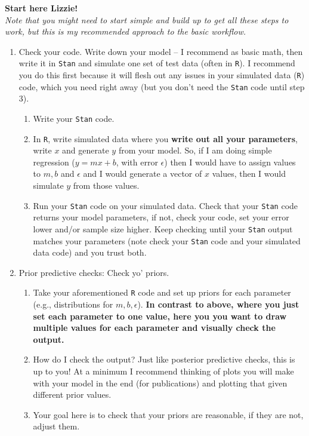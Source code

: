 \documentclass[11pt]{article}
\begin{document}
{\Large \bf Start here Lizzie!} \\

\emph{Note that you might need to start simple and build up to get all these steps to work, but this is my recommended approach to the basic workflow.}

\begin{enumerate}
\item Check your code. Write down your model -- I recommend as basic math, then write it in \verb|Stan| and simulate one set of test data (often in \verb|R|). I recommend you do this first because it will flesh out any issues in your simulated data (\verb|R|) code, which you need right away (but you don't need the \verb|Stan| code until step 3).
\begin{enumerate}
\item Write your \verb|Stan| code.
\item In \verb|R|, write simulated data where you {\bf write out all your parameters}, write $x$ and generate $y$ from your model. So, if I am doing simple regression ($y=mx+b$, with error $\epsilon$) then I would have to assign values to $m, b$ and $\epsilon$ and I would generate a vector of $x$ values, then I would simulate $y$ from those values.
\item Run your \verb|Stan| code on your simulated data. Check that your \verb|Stan| code returns your model parameters, if not, check your code, set your error lower and/or sample size higher. Keep checking until your \verb|Stan| output matches your parameters (note check your \verb|Stan| code and your simulated data code) and you trust both.
\end{enumerate}
\item Prior predictive checks: Check yo' priors.
\begin{enumerate}
\item Take your aforementioned \verb|R| code and set up priors for each parameter (e.g., distributions for $m, b, \epsilon$). {\bf In contrast to above, where you just set each parameter to one value, here you you want to draw multiple values for each parameter and visually check the output.} 
\item How do I check the output? Just like posterior predictive checks, this is up to you! At a minimum I recommend thinking of plots you will make with your model in the end (for publications) and plotting that given different prior values.
\item Your goal here is to check that your priors are reasonable, if they are not, adjust them. 

\end{enumerate}
\end{enumerate}
\end{document}
